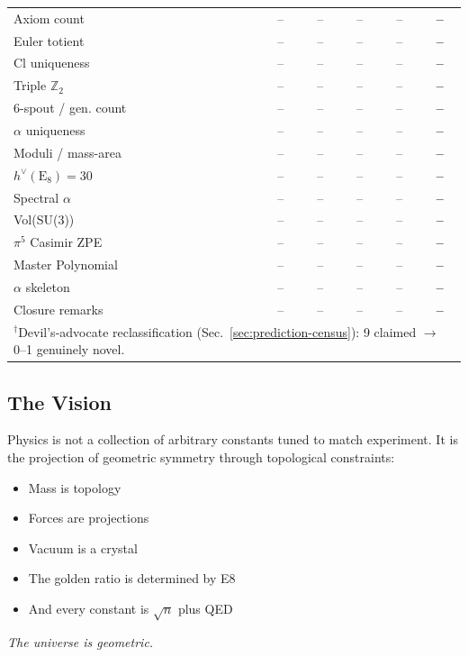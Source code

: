 \documentclass[aps,prd,twocolumn,superscriptaddress,floatfix,nofootinbib]{revtex4-2}
\theoremstyle{definition}
\theoremstyle{remark}
\begin{document}
\begin{table}[ht]
\begin{tabular}{lccccc}
Axiom count & -- & -- & -- & -- & \textbf{--} \\
Euler totient & -- & -- & -- & -- & \textbf{--} \\
Cl uniqueness & -- & -- & -- & -- & \textbf{--} \\
Triple $\mathbb{Z}_2$ & -- & -- & -- & -- & \textbf{--} \\
6-spout / gen. count & -- & -- & -- & -- & \textbf{--} \\
$\alpha$ uniqueness & -- & -- & -- & -- & \textbf{--} \\
Moduli / mass-area & -- & -- & -- & -- & \textbf{--} \\
$h^\vee(\mathrm{E}_8){=}30$ & -- & -- & -- & -- & \textbf{--} \\
Spectral $\alpha$ & -- & -- & -- & -- & \textbf{--} \\
Vol(SU(3)) & -- & -- & -- & -- & \textbf{--} \\
$\pi^5$ Casimir ZPE & -- & -- & -- & -- & \textbf{--} \\
Master Polynomial & -- & -- & -- & -- & \textbf{--} \\
$\alpha$ skeleton & -- & -- & -- & -- & \textbf{--} \\
Closure remarks & -- & -- & -- & -- & \textbf{--} \\
\bottomrule
\multicolumn{6}{l}{\footnotesize $^\dagger$Devil's-advocate reclassification (Sec.~\ref{sec:prediction-census}): 9 claimed $\to$ 0--1 genuinely novel.}
\end{tabular}
\end{table}

\subsection{The Vision}

Physics is not a collection of arbitrary constants tuned to match experiment. It is the projection of geometric symmetry through topological constraints:

\begin{itemize}
\item Mass is topology
\item Forces are projections
\item Vacuum is a crystal
\item The golden ratio is determined by E8
\item And every constant is $\sqrt{n}$ plus QED
\end{itemize}

\textit{The universe is geometric.}
\end{document}
